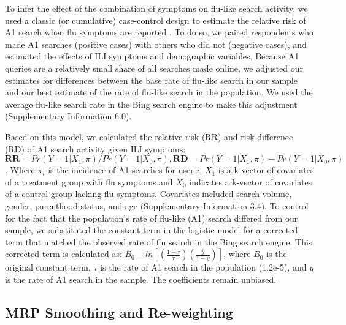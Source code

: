 \documentclass[fleqn,10pt]{wlscirep}
\begin{document}
To infer the effect of the combination of symptoms on flu-like search activity, we used a classic (or cumulative) case-control design to estimate the relative risk of A1 search when flu symptoms are reported \cite{king_and_zeng_2001}. To do so, we paired respondents who made A1 searches (positive cases) with others who did not (negative cases), and estimated the effects of ILI symptoms and demographic variables. Because A1 queries are a relatively small share of all searches made online, we adjusted our estimates for differences between the base rate of flu-like search in our sample and our best estimate of the rate of flu-like search in the population. We used the average flu-like search rate in the Bing search engine to make this adjustment (Supplementary Information 6.0). 

Based on this model, we calculated the relative risk (RR) and risk difference (RD) of A1 search activity given ILI symptoms: $\textbf{RR} = Pr(Y=1|X_1, \pi) / Pr(Y=1|X_0, \pi), \textbf{RD} = Pr(Y=1|X_1, \pi) - Pr(Y=1|X_0, \pi)     
$ \cite{king_and_zeng_2001}. Where $\pi_i$ is the incidence of A1 searches for user $i$, $X_1$ is a k-vector of covariates of a treatment group with flu symptoms and $X_0$ indicates a k-vector of covariates of a control group lacking flu symptoms. Covariates included search volume, gender, parenthood status, and age (Supplementary Information 3.4). To control for the fact that the population's rate of flu-like (A1) search differed from our sample, we substituted the constant term in the logistic model for a corrected term that matched the observed rate of flu search in the Bing search engine. This corrected term is calculated as: $B_0 - ln[ (\frac{1-\tau}{\tau}) (\frac{\bar{y}}{1-\bar{y}}) ]$, where $B_0$ is the original constant term, $\tau$ is the rate of A1 search in the population (1.2e-5), and $\bar{y}$ is the rate of A1 search in the sample. The coefficients remain unbiased. 

\subsection*{MRP Smoothing and Re-weighting}
\end{document}

